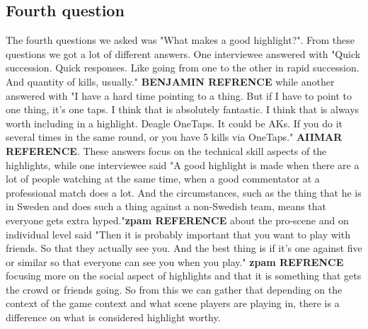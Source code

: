 \documentclass[a4paper,twoside]{bth}
\begin{document}
\subsection{Fourth question}
The fourth questions we asked was "What makes a good highlight?". From these questions we got a lot of different answers. One interviewee answered with "Quick succession. Quick responses. Like going from one to the other in rapid succession. And quantity of kills, usually." \textbf{BENJAMIN REFRENCE} while another answered with "I have a hard time pointing to a thing. But if I have to point to one thing, it's one taps. I think that is absolutely fantastic. I think that is always worth including in a highlight. Deagle OneTaps. It could be AKs. If you do it several times in the same round, or you have 5 kills via OneTaps." \textbf{AIIMAR REFERENCE}. These answers focus on the technical skill aspects of the highlights, while one interviewee said "A good highlight is made when there are a lot of people watching at the same time, when a good commentator at a professional match does a lot. And the circumstances, such as the thing that he is in Sweden and does such a thing against a non-Swedish team, means that everyone gets extra hyped."\textbf{zpam REFERENCE} about the pro-scene and on individual level said "Then it is probably important that you want to play with friends. So that they actually see you. And the best thing is if it's one against five or similar so that everyone can see you when you play." \textbf{zpam REFRENCE} focusing more on the social aspect of highlights and that it is something that gets the crowd or friends going. So from this we can gather that depending on the context of the game context and what scene players are playing in, there is a difference on what is considered highlight worthy.\\\\
\end{document}

